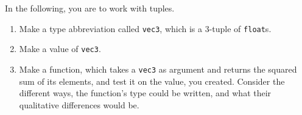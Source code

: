 In the following, you are to work with tuples.
\begin{enumerate}
  \item Make a type abbreviation called \lstinline{vec3}, which is a 3-tuple of \lstinline{float}s.
  \item Make a value of \lstinline{vec3}.
  \item Make a function, which takes a \lstinline{vec3} as argument and returns the squared sum of its elements, and test it on the value, you created. Consider the different ways, the function's type could be written, and what their qualitative differences would be.
\end{enumerate}
  